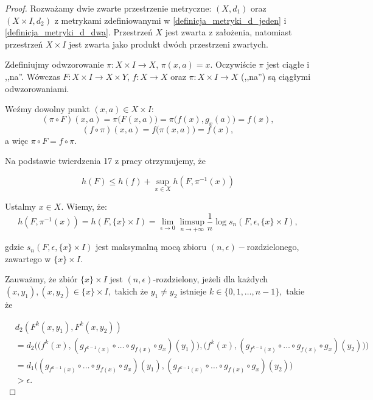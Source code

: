 \documentclass[licencjacka]{pwr_wmat_praca_dyplomowa}
\theoremstyle{plain}
\numberwithin{theorem}{chapter}
\theoremstyle{definition}
\numberwithin{theorem}{chapter}
\begin{document}
\begin{proof}

Rozważamy dwie zwarte przestrzenie metryczne: $(X, d_1)$ oraz $(X \times I, d_2)$ z metrykami zdefiniowanymi w \ref{definicja_metryki_d_jeden} i \ref{definicja_metryki_d_dwa}. Przestrzeń $X$ jest zwarta z założenia, natomiast przestrzeń $X \times I$ jest zwarta jako produkt dwóch przestrzeni zwartych. 

Zdefiniujmy odwzorowanie $\pi: X \times I \rightarrow X$, $\pi(x,a) = x$. Oczywiście $\pi$ jest ciągłe i ,,na''.
Wówczas $F: X \times I \rightarrow X \times Y$, $f: X \rightarrow X$ oraz $\pi: X \times I \rightarrow X$ (,,na'') są ciągłymi odwzorowaniami. 

Weźmy dowolny punkt $(x, a) \in X \times I$:
$$(\pi \circ F)(x, a) = \pi\big(F(x,a)\big) = \pi\big(f(x), g_x(a)\big) = f(x),$$
$$(f \circ \pi)(x, a) = f\big(\pi(x,a)\big) = f(x),$$
a więc $\pi \circ F = f \circ \pi.$


Na podstawie twierdzenia 17 z pracy  \cite[s.~409]{bowen1971entropy__do_dowodu_rownosci_topologicznej_entropii_2_twierdzenie17} otrzymujemy, że 

$$h(F) \leq h(f) + \sup_{x \in X} h(F, \pi^{-1}(x))$$


Ustalmy $x \in X.$ Wiemy, że:
$$h(F, \pi^{-1}(x)) = h(F, \{x\} \times I) = \lim_{\epsilon \rightarrow 0} \limsup_{n \rightarrow +\infty} \frac{1}{n} \log s_n(F, \epsilon, \{x\} \times I),$$

gdzie $s_n(F, \epsilon, \{x\} \times I)$ jest maksymalną mocą zbioru $(n, \epsilon)-$rozdzielonego, zawartego w $\{x\} \times I.$

Zauważmy, że zbiór $\{x\} \times I$ jest $(n, \epsilon)$-rozdzielony, jeżeli dla każdych $(x, y_1), (x, y_2) \in \{x\} \times I,$ takich że $y_1 \neq y_2$ istnieje $k \in \{0, 1, \ldots, n-1\},$ takie że 

\begin{equation}
\label{nierownosc_zbioru_rozdzielonego_d2}
\begin{aligned}
& d_2(F^k(x, y_1), F^k(x, y_2)) \\
& = d_2 \big( \big(f^k(x), (g_{f^{k-1}(x)} \circ \ldots \circ g_{f(x)} \circ g_x)(y_1) \big), \big(f^k(x), (g_{f^{k-1}(x)} \circ \ldots \circ g_{f(x)} \circ g_x)(y_2) \big)
\big) \\
& = d_1\big((g_{f^{k-1}(x)} \circ \ldots \circ g_{f(x)} \circ g_x)(y_1), (g_{f^{k-1}(x)} \circ \ldots \circ g_{f(x)} \circ g_x)(y_2)\big) \\
& > \epsilon.
\end{aligned}
\end{equation}



\end{proof}
\end{document}
